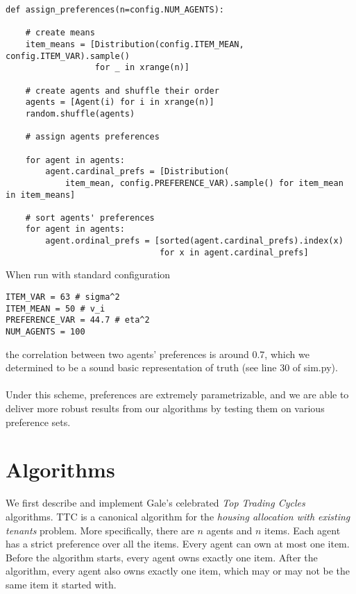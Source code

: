 \documentclass[12pt]{article}
\begin{document}
\begin{verbatim}
def assign_preferences(n=config.NUM_AGENTS):

    # create means
    item_means = [Distribution(config.ITEM_MEAN, config.ITEM_VAR).sample()
                  for _ in xrange(n)]

    # create agents and shuffle their order
    agents = [Agent(i) for i in xrange(n)]
    random.shuffle(agents)

    # assign agents preferences

    for agent in agents:
        agent.cardinal_prefs = [Distribution(
            item_mean, config.PREFERENCE_VAR).sample() for item_mean in item_means]

    # sort agents' preferences
    for agent in agents:
        agent.ordinal_prefs = [sorted(agent.cardinal_prefs).index(x)
                               for x in agent.cardinal_prefs]
\end{verbatim}

\noindent When run with standard configuration
\begin{verbatim}
ITEM_VAR = 63 # sigma^2
ITEM_MEAN = 50 # v_i
PREFERENCE_VAR = 44.7 # eta^2
NUM_AGENTS = 100
\end{verbatim}
\noindent the correlation between two agents' preferences is around 0.7, which we determined to be a sound basic representation of truth (see line 30 of sim.py).
\\\\Under this scheme, preferences are extremely parametrizable, and we are able to deliver more robust results from our algorithms by testing them on various preference sets.

\section*{Algorithms}

We first describe and implement Gale's celebrated \textit{Top Trading Cycles} algorithms. TTC is a canonical algorithm for the \textit{housing allocation with existing tenants} problem. More specifically, there are $n$ agents and $n$ items. Each agent has a strict preference over all the items. Every agent can own at most one item. Before the algorithm starts, every agent owns exactly one item. After the algorithm, every agent also owns exactly one item, which may or may not be the same item it started with. 
\end{document}
